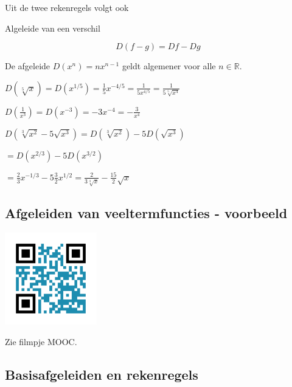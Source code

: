 Uit de twee rekenregels volgt ook
\begin{eigenschap} Algeleide van een verschil
	
\[D(f-g)=Df-Dg\]
\end{eigenschap}\vspace{5 mm}
\begin{eigenschap}
	De afgeleide $D(x^n)=nx^{n-1}$ geldt algemener voor alle $n\in \mathbb{R}$.
\end{eigenschap}

\begin{voorbeeld}
	$D(\sqrt[5]{x})=D(x^{1/5})=\frac{1}{5}x^{-4/5}=\frac{1}{5x^{4/5}}=\frac{1}{5\sqrt[5]{x^4}}$
\end{voorbeeld}

\begin{voorbeeld}
	$D(\frac{1}{x^3})=D(x^{-3})=-3x^{-4}=-\frac{3}{x^4}$
\end{voorbeeld}

\begin{voorbeeld}
	$D(\sqrt[3]{x^2}-5\sqrt{x^3})=D(\sqrt[3]{x^2})-5D(\sqrt{x^3})$
	
	\hspace{5mm} $=D(x^{2/3})-5D(x^{3/2})$
	
	\hspace{5mm} $=\frac{2}{3}x^{-1/3}-5\frac{3}{2}x^{1/2}=\frac{2}{3\sqrt[3]{x}}-\frac{15}{2}\sqrt{x}$
\end{voorbeeld}

\subsection{Afgeleiden van veeltermfuncties - voorbeeld}

\begin{minipage}{.25\linewidth}
	\raggedright
	\includegraphics[width=4cm]{6_afgeleiden_integralen/inputs/QR_Code_AFGVTFTIES_module6}
\end{minipage}
\begin{minipage}{.7\linewidth}
	Zie filmpje MOOC.
\end{minipage}

\subsection{Basisafgeleiden en rekenregels}
